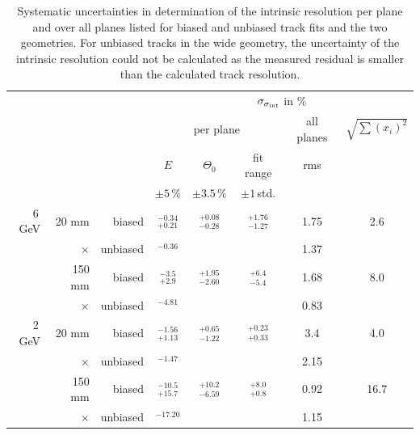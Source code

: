 \begin{table}[tbp]
 \begin{center}
  \begin{tabular}{r|r|r|c|c|c|c||c}
  \multicolumn{3}{c|}{} & \multicolumn{5}{c}{$\sigma_{\sigma_{\textrm{int}}}$ in \%}\\
  \multicolumn{3}{c|}{} & \multicolumn{3}{c|}{per plane} & all planes& $\sqrt{\sum (x_i)^2}$\\
  \multicolumn{3}{c|}{} &$E$         & $\Theta_0$      & fit range    & rms &  \\ 
  \multicolumn{3}{c|}{} & $\pm5\,\%$ &  $\pm 3.5\,\%$  & $\pm 1\,$std.&               &  \\ \hline
  6\,GeV & 20 mm   &  biased  &  ${}^{-0.34}_{+0.21}$ & ${}^{+0.08}_{-0.28}$ & ${}^{+1.76}_{-1.27}$ & 1.75 &  2.6  \\
         & ×       & unbiased &  ${}^{-0.36}_{}$ &  &  & 1.37 &    \\
	 & 150 mm  &  biased  &  ${}^{-3.5}_{+2.9}$   & ${}^{+1.95}_{-2.60}$ & ${}^{+6.4}_{-5.4}$ & 1.68 &  8.0  \\
	 & ×       & unbiased &  ${}^{-4.81}_{}$ &  &  & 0.83 &    \\ \hline
  2\,GeV & 20 mm   &  biased  &  ${}^{-1.56}_{+1.13}$ & ${}^{+0.65}_{-1.22}$ & ${}^{+0.23}_{+0.33}$ & 3.4 &  4.0  \\
         & ×       & unbiased &  ${}^{-1.47}_{}$ &  &  & 2.15 &    \\
	 & 150 mm  &  biased  &  ${}^{-10.5}_{+15.7}$ & ${}^{+10.2}_{-6.59}$ & ${}^{+8.0}_{+0.8}$ & 0.92 &  16.7 \\
	 & ×       & unbiased &  ${}^{-17.20}_{}$ &  &  & 1.15 &    \\ 
  \end{tabular}
    \caption[Systematic uncertainties]{Systematic uncertainties in determination of the intrinsic resolution per plane and over all planes listed for biased and unbiased track fits and the two geometries.
  For unbiased tracks in the wide geometry, the uncertainty of the intrinsic resolution could not be calculated as the measured residual is smaller than the calculated track resolution.}
  \label{tab:uncerts}
 \end{center}
\end{table}

